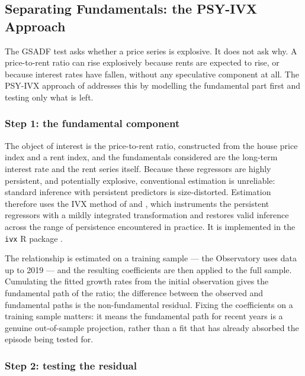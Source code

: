\subsection{Separating Fundamentals: the PSY-IVX Approach}
\label{subsec:psyivx}

The GSADF test asks whether a price series is explosive. It does not ask
why. A price-to-rent ratio can rise explosively because rents are expected to
rise, or because interest rates have fallen, without any speculative
component at all. The PSY-IVX approach of \citet{shi2021} addresses this by
modelling the fundamental part first and testing only what is left.

\subsubsection{Step 1: the fundamental component}

The object of interest is the price-to-rent ratio, constructed from the
house price index and a rent index, and the fundamentals considered are the
long-term interest rate and the rent series itself. Because these regressors
are highly persistent, and potentially explosive, conventional estimation is
unreliable: standard inference with persistent predictors is size-distorted.
Estimation therefore uses the IVX method of \citet{magdalinos2009} and
\citet{kostakis2015}, which instruments the persistent regressors with a
mildly integrated transformation and restores valid inference across the
range of persistence encountered in practice. It is implemented in the
\texttt{ivx} \textsf{R} package \citep{ivx}.

The relationship is estimated on a training sample --- the Observatory uses
data up to 2019 --- and the resulting coefficients are then applied to the
full sample. Cumulating the fitted growth rates from the initial observation
gives the fundamental path of the ratio; the difference between the observed
and fundamental paths is the non-fundamental residual. Fixing the
coefficients on a training sample matters: it means the fundamental path for
recent years is a genuine out-of-sample projection, rather than a fit that
has already absorbed the episode being tested for.

\subsubsection{Step 2: testing the residual}

